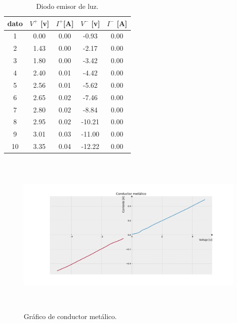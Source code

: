 \documentclass[]{article}
\begin{document}
\begin{table}
  \centering
  \begin{tabular}{|c|c|c|c|c|} \hline
    dato    &   $V^{+}$ [v]  &    $I^{+}$[A]  &   $V^{-}$ [v]  &    $I^{-}$ [A]  \\ \hline
    1&0.00& 0.00&     -0.93	&0.00\\ \hline
    2&1.43& 0.00&     -2.17	&0.00\\ \hline
    3&1.80& 0.00&     -3.42	&0.00\\ \hline
    4&2.40& 0.01&     -4.42	&0.00\\ \hline
    5&2.56& 0.01&     -5.62	&0.00\\ \hline
    6&2.65& 0.02&     -7.46	&0.00\\ \hline
    7&2.80& 0.02&     -8.84	&0.00\\ \hline
    8&2.95& 0.02&     -10.21	&0.00\\ \hline
    9&3.01& 0.03&     -11.00	&0.00\\ \hline
    10&3.35& 0.04&     -12.22	&0.00\\ \hline
    
    
  \end{tabular}
  \caption{\label{tab: emisor-luz} Diodo emisor de luz.}
\end{table}

\begin{figure}
  \centering
  \includegraphics[width=12cm, height=8cm]{img/Figure_2.png}
  \caption{\label{fig: fig-conductor}Gráfico de conductor metálico.} 
\end{figure}
\end{document}
